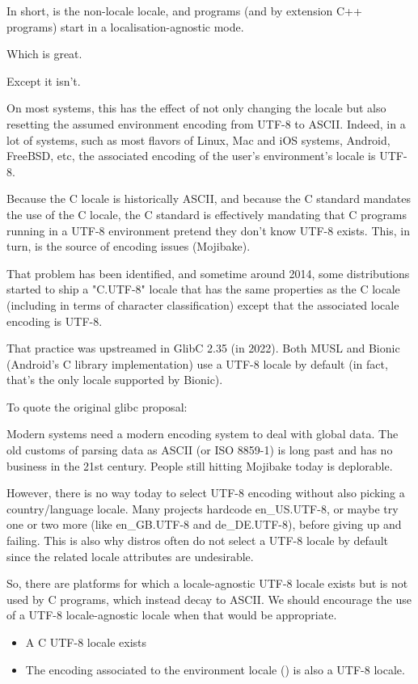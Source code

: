 \documentclass{wg21}
\begin{document}
In short,  is the non-locale locale, and  programs (and by extension C++ programs) start in a localisation-agnostic mode.

Which is great.

Except it isn't.


On most systems, this has the effect of not only changing the locale but also resetting the assumed environment encoding from UTF-8 to ASCII.
Indeed, in a lot of systems, such as most flavors of Linux, Mac and iOS systems, Android, FreeBSD, etc, the associated encoding of the user's environment's locale is UTF-8.

Because the C locale is historically ASCII, and because the C standard mandates the use of the C locale, the C standard is effectively
mandating that C programs running in a UTF-8 environment pretend they don't know UTF-8 exists.
This, in turn, is the source of encoding issues (Mojibake).

That problem has been identified, and sometime around 2014, some distributions started to ship a "C.UTF-8" locale that has the same properties as the C locale (including in terms of character classification) except that the associated locale encoding is UTF-8.

That practice was upstreamed in GlibC 2.35 (in 2022).
Both MUSL and Bionic (Android's C library implementation) use a UTF-8 locale by default (in fact, that's the only locale supported by Bionic).

To quote the original glibc proposal:

\begin{quoteblock}
Modern systems need a modern encoding system to deal with global data. The old customs of parsing data as ASCII (or ISO 8859-1) is long past and has no business in the 21st century. People still hitting Mojibake today is deplorable.

However, there is no way today to select UTF-8 encoding without also picking a country/language locale. Many projects hardcode en_US.UTF-8, or maybe try one or two more (like en_GB.UTF-8 and de_DE.UTF-8), before giving up and failing. This is also why distros often do not select a UTF-8 locale by default since the related locale attributes are undesirable.
\end{quoteblock}

So, there are platforms for which a locale-agnostic UTF-8 locale exists but is not used by C programs, which instead decay to ASCII.
We should encourage the use of a UTF-8 locale-agnostic locale when that would be appropriate.
\begin{itemize}
\item A C UTF-8 locale exists
\item The encoding associated to the environment locale  () is also a UTF-8 locale.
\end{itemize}
\end{document}
